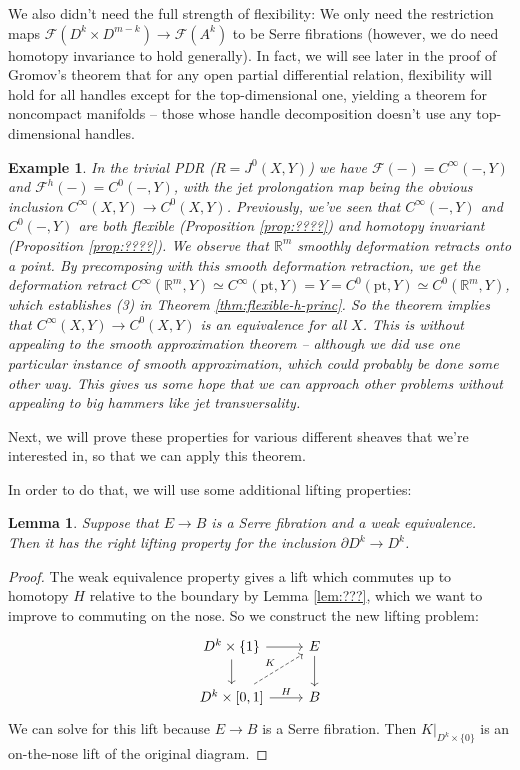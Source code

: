 \documentclass{article}
\newtheorem{lemma}[theorem]{Lemma}
\newtheorem{example}[theorem]{Example}
\newtheorem{proposed work}[theorem]{Proposed Work}
\theoremstyle{definition}
\begin{document}
We also didn't need the full strength of flexibility: We only need the restriction maps $\mathcal F(D^k \times D^{m-k}) \to \mathcal F(A^k)$ to be Serre fibrations (however, we do need homotopy invariance to hold generally). In fact, we will see later in the proof of Gromov's theorem that for any open partial differential relation, flexibility will hold for all handles except for the top-dimensional one, yielding a theorem for noncompact manifolds -- those whose handle decomposition doesn't use any top-dimensional handles.

\begin{example}
In the trivial PDR ($R = J^0(X,Y)$) we have $\mathcal F(-) = C^\infty(-,Y)$ and $\mathcal F^h(-) = C^0(-,Y)$, with the jet prolongation map being the obvious inclusion $C^\infty(X,Y) \to C^0(X,Y)$. Previously, we've seen that $C^\infty(-,Y)$ and $C^0(-,Y)$ are both flexible (Proposition \ref{prop:????}) and homotopy invariant (Proposition \ref{prop:????}). We observe that $\mathbb R^m$ smoothly deformation retracts onto a point. By precomposing with this smooth deformation retraction, we get the deformation retract $C^\infty(\mathbb R^m, Y) \simeq C^\infty(\mathrm{pt},Y) = Y = C^0(\mathrm{pt},Y) \simeq C^0(\mathbb R^m,Y)$, which establishes (3) in Theorem \ref{thm:flexible-h-princ}. So the theorem implies that $C^\infty(X,Y) \to C^0(X,Y)$ is an equivalence for all $X$. This is without appealing to the smooth approximation theorem -- although we did use one particular instance of smooth approximation, which could probably be done some other way. This gives us some hope that we can approach other problems without appealing to big hammers like jet transversality.
\end{example}

Next, we will prove these properties for various different sheaves that we're interested in, so that we can apply this theorem.

In order to do that, we will use some additional lifting properties:

\begin{lemma}
Suppose that $E \to B$ is a Serre fibration and a weak equivalence. Then it has the right lifting property for the inclusion $\partial D^k \to D^k$.
\end{lemma}
\begin{proof}
The weak equivalence property gives a lift which commutes up to homotopy $H$ relative to the boundary by Lemma \ref{lem:???}, which we want to improve to commuting on the nose. So we construct the new lifting problem:
\[
\begin{tikzcd}
D^k \times \{1\} \ar[r] \ar[d] & E \ar[d] \\
D^k \times [0,1] \ar[r,"H"] \ar[ur,dashed,"K"] & B
\end{tikzcd}
\]
We can solve for this lift because $E \to B$ is a Serre fibration. Then $K|_{D^k \times \{0\}}$ is an on-the-nose lift of the original diagram.
\end{proof}
\end{document}

